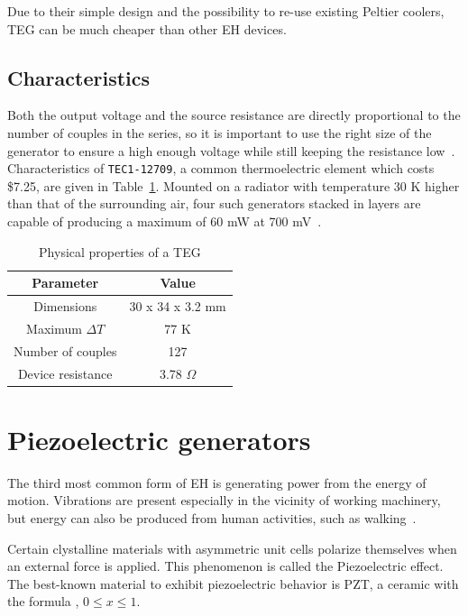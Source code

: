 \documentclass[a4paper,10pt]{article}
\begin{document}
Due to their simple design and the possibility to re-use existing Peltier coolers, \ac{TEG} can be much cheaper than other \ac{EH} devices. 

\subsection{Characteristics}

Both the output voltage and the source resistance are directly proportional to the number of couples in the series, so it is important to use the right size of the generator to ensure a high enough voltage while still keeping the resistance low~\cite{Salerno10}. Characteristics of \texttt{TEC1-12709}, a common thermoelectric element which costs \$7.25, are given in Table~\ref{tab:teg-radiator}. Mounted on a radiator with temperature 30 K higher than that of the surrounding air, four such generators stacked in layers are capable of producing a maximum of 60 mW at 700 mV~\cite{teg-wsn-ieee}. 

\begin{table}[h]
  \centering
  \begin{tabular}{|c|c|}
\hline
    Parameter & Value \\
\hline
Dimensions & 30 x 34 x 3.2 mm \\
Maximum $\Delta T$ & 77 K \\
Number of couples & 127 \\
Device resistance & 3.78 $\Omega$ \\
\hline
  \end{tabular}
\caption{Physical properties of a \ac{TEG}}
\label{tab:teg-radiator}
\end{table}

\section{Piezoelectric generators}

The third most common form of \ac{EH} is generating power from the energy of motion. Vibrations are present especially in the vicinity of working machinery, but energy can also be produced from human activities, such as walking~\cite{piezo-shoe-ieee}. 

Certain clystalline materials with asymmetric unit cells polarize themselves when an external force is applied. This phenomenon is called the Piezoelectric effect. The best-known material to exhibit piezoelectric behavior is \ac{PZT}, a ceramic with the formula , $0\leq x \leq 1$.
\end{document}
